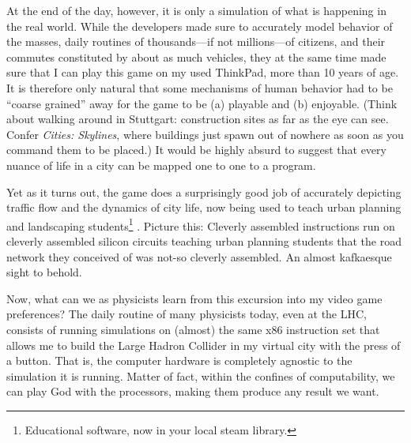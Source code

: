 At the end of the day, however, it is only a simulation of what is happening in
the real world. While the developers made sure to accurately model behavior of
the masses, daily routines of thousands---if not millions---of citizens, and
their commutes constituted by about as much vehicles, they at the same time
made sure that I can play this game on my used ThinkPad, more than 10 years of age. It is
therefore only natural that some mechanisms of human behavior had to be
\enquote{coarse grained} away for the game to be (a) playable and (b)
enjoyable. (Think about walking around in Stuttgart: construction sites as far
as the eye can see. Confer \emph{Cities: Skylines}, where buildings just
spawn out of nowhere as soon as you command them to be placed.)
It would be highly absurd to suggest that every nuance of life in a city can
be mapped one to one to a program.

Yet as it turns out, the game does a surprisingly good job of accurately
depicting traffic flow and the dynamics of city life, now being used to teach
urban planning and landscaping students\footnote{Educational software, now in
your local steam library.}
\cite{khanPerceptionsStudentsGamification2021,haahtelaGamificationEducationCities2015}.
Picture this: Cleverly assembled instructions run on cleverly assembled silicon
circuits teaching urban planning students that the road network they conceived
of was not-so cleverly assembled. An almost kafkaesque sight to behold.

Now, what can we as physicists learn from this excursion into my video game
preferences? The daily routine of many physicists today, even at the LHC,
consists of running simulations on (almost) the same x86 instruction set that
allows me to build the Large Hadron Collider in my virtual city with the press
of a button. That is, the computer
hardware is completely agnostic to the simulation it is running. Matter of
fact, within the confines of computability, we can play God with the processors,
making them produce any result we want.

